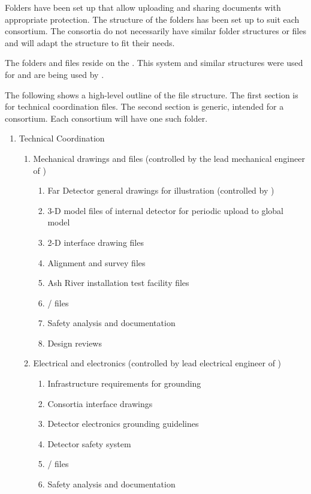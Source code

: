 Folders have been set up that allow uploading and sharing
documents with appropriate protection. The structure of the folders
has been set up to suit each consortium. The
consortia do not necessarily have similar folder structures or files and will adapt
the structure to fit their needs.


The folders and files reside on the . This system and
similar structures were used for  and are being
used by .


The following shows a high-level outline of the file structure. The
first section is for technical coordination files. The second
section is generic, intended for a consortium. Each consortium will have one such
folder.
\begin{enumerate}
 \item Technical Coordination
 \begin{enumerate}
  \item Mechanical drawings and files (controlled by the lead mechanical engineer of )
  \begin{enumerate}
    \item Far Detector general drawings for illustration (controlled by )
    \item 3-D model files of internal detector for periodic upload to global model
    \item 2-D interface drawing files    
    \item Alignment and survey files
    \item Ash River installation test facility files
    \item {}/ files
    \item Safety analysis and documentation
    \item Design reviews
  \end{enumerate}
  \item Electrical and electronics (controlled by lead electrical engineer of )
  \begin{enumerate}
    \item Infrastructure requirements for grounding
    \item Consortia interface drawings
    \item Detector electronics grounding guidelines
    \item Detector safety system
    \item {}/ files
    \item Safety analysis and documentation

\end{enumerate}
\end{enumerate}
\end{enumerate}
